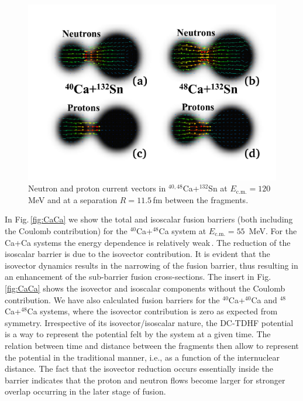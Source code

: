 \begin{figure}
	\centering
	\includegraphics*[width=\textwidth]{../Figures/Isospin/current.pdf}
	\caption{Neutron and proton current vectors in $^{40,48}$Ca+$^{132}$Sn at $E_\mathrm{c.m.}=120$\,MeV and at
		a separation  $R=11.5$\,fm between the fragments.}
	\label{fig:current}
\end{figure}

In Fig.\,\ref{fig:CaCa} we show the total and isoscalar fusion barriers (both including the Coulomb contribution)
for the $^{40}$Ca+$^{48}$Ca system at $E_\mathrm{c.m.}=55$~MeV.
For the Ca+Ca systems the energy dependence is relatively
weak\,\citep{keser2012,umar2014a,washiyama2008}.
The reduction of the isoscalar barrier is due to the isovector contribution. It is evident that
the isovector dynamics results in the narrowing of the fusion barrier, thus resulting in an enhancement of the sub-barrier
fusion cross-sections. The insert in Fig.\,\ref{fig:CaCa} shows the isovector and isoscalar components without the Coulomb contribution.
We have also calculated fusion barriers for the $^{40}$Ca+$^{40}$Ca and $^{48}$Ca+$^{48}$Ca systems, where the isovector contribution is
zero as expected from symmetry.
Irrespective of its isovector/isoscalar nature, the DC-TDHF potential is a way to represent the potential felt by the system at a given time. The relation between time and distance between the fragments then allow to represent the potential in the traditional manner, i.e., as a function of the internuclear distance. The fact that the isovector reduction occurs essentially inside the barrier indicates that the proton and neutron flows become larger for stronger overlap occurring in the later stage of fusion.

